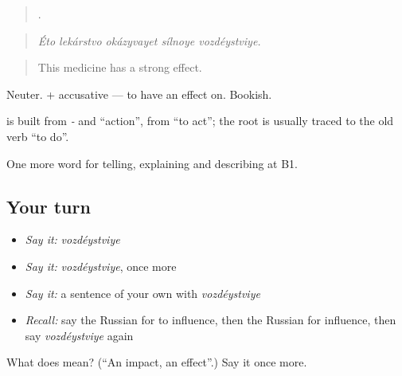 \begin{quote}
    .
\end{quote}

\begin{quote}
\emph{Éto lekárstvo okázyvayet sílnoye vozdéystviye.}
\end{quote}

\begin{quote}
This medicine has a strong effect.
\end{quote}

Neuter. \emph{  } + accusative — to have an effect on. Bookish.

\begin{cousinweb}
\textbf{} is built from \emph{-} and \emph{} \textquotedblleft{}action\textquotedblright{}, from \emph{} \textquotedblleft{}to act\textquotedblright{}; the root is usually traced to the old verb \emph{} \textquotedblleft{}to do\textquotedblright{}.
\end{cousinweb}

\begin{grammarlens}[title={What you've built}]
One more word for telling, explaining and describing at B1.
\end{grammarlens}

\subsection*{Your turn}
\begin{itemize}
\raggedright
  \item \emph{Say it:} \emph{vozdéystviye}
  \item \emph{Say it:} \emph{vozdéystviye}, once more
  \item \emph{Say it:} a sentence of your own with \emph{vozdéystviye}
  \item \emph{Recall:} say the Russian for to influence, then the Russian for influence, then say \emph{vozdéystviye} again
\end{itemize}

\begin{tcolorbox}[breakable,colback=teal!4,colframe=teal!35!black,title={Before you move on}]
What does  mean? (\textquotedblleft{}An impact, an effect\textquotedblright{}.) Say it once more.
\end{tcolorbox}
